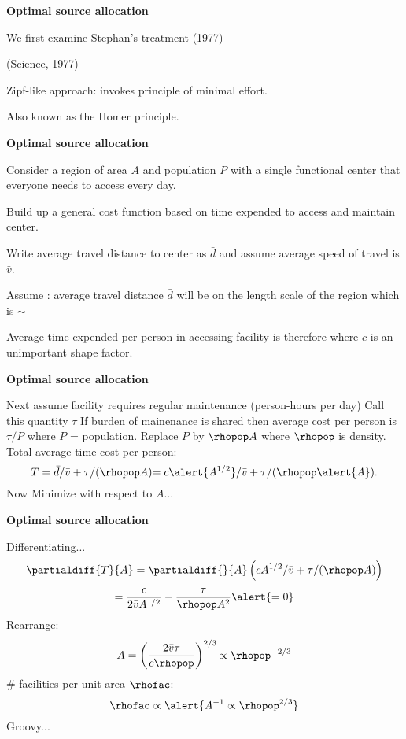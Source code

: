   


  \textbf{Optimal source allocation}

    
     
      We first examine Stephan's treatment (1977)\cite{stephan1977a,stephan1984a}
    
       (Science, 1977)
    
      Zipf-like approach: invokes \alert{principle of minimal effort}.
    
      Also known as the Homer principle.
    


  \textbf{Optimal source allocation}

  
   
    Consider a region of area $A$ and population $P$ with
    a single functional center that everyone needs to access
    every day.
  
    Build up a general cost function based on time expended
    to \alert{access and maintain center}.
  
    Write \alert{average travel distance} to center as $\bar{d}$ and 
    assume \alert{average speed of travel} is $\bar{v}$.
  
    Assume : average travel distance $\bar{d}$ will be on the length
    scale of the region which is $\sim$ 
  
    Average time expended per person in accessing facility
    is therefore
    where $c$ is an unimportant shape factor.
  


  \textbf{Optimal source allocation}

  
   Next assume facility requires regular maintenance (person-hours per day)
   Call this quantity $\tau$
   If burden of mainenance is shared then average cost per person
    is \alert{$\tau/P$} where $P$ = population.
   Replace $P$ by $\rhopop A$ where $\rhopop$ is density.
   Total average time cost per person:
    $$
    T = \bar{d}/\bar{v} + \tau/(\rhopop A) 
    {= c \alert{A^{1/2}}/\bar{v} + \tau/(\rhopop \alert{A}).}
    $$
   Now Minimize with respect to $A$...
  


  \textbf{Optimal source allocation}

  
   Differentiating...
    $$
    \partialdiff{T}{A} = 
    \partialdiff{}{A} \left( c A^{1/2}/\bar{v} + \tau/(\rhopop A) \right)
    $$
    $$
    {
      =
      \frac{c}{2\bar{v} A^{1/2}}
      -\frac{\tau}{\rhopop A^2}
    }
    {
      \alert{ = 0 }
    }
    $$
   Rearrange:
    $$
    A = 
    \left(
      \frac{2 \bar{v} \tau}
      {c \rhopop}
    \right)^{2/3}
    {
      \propto \rhopop^{-2/3}
    }
    $$
   \# facilities per unit area $\rhofac$:
    $$ 
    \rhofac
    \propto
    \alert{A^{-1}  \propto \rhopop^{2/3}}
    $$
   Groovy...
    
